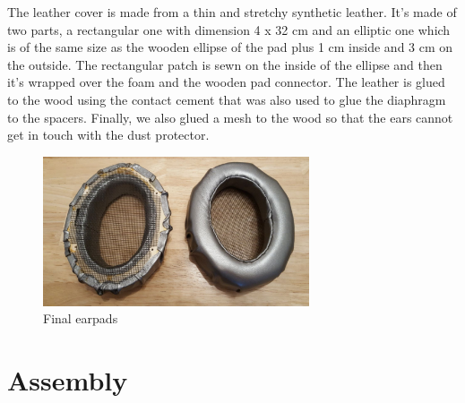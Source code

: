 \documentclass{article}
\begin{document}
The leather cover is made from a thin and stretchy synthetic leather. It's made of two parts, a rectangular one with dimension 4 x 32 cm and an elliptic one which is of the same size as the wooden ellipse of the pad plus 1 cm inside and 3 cm on the outside. The rectangular patch is sewn on the inside of the ellipse and then it's wrapped over the foam and the wooden pad connector. The leather is glued to the wood using the contact cement that was also used to glue the diaphragm to the spacers. Finally, we also glued a mesh to the wood so that the ears cannot get in touch with the dust protector.

\begin{figure}
\centering
\includegraphics[width=0.7\textwidth]{images/earpads_final.jpg}
\caption{Final earpads}
\label{f:pads:final}
\end{figure}


\section{Assembly}
\label{s:assembly}
\end{document}
